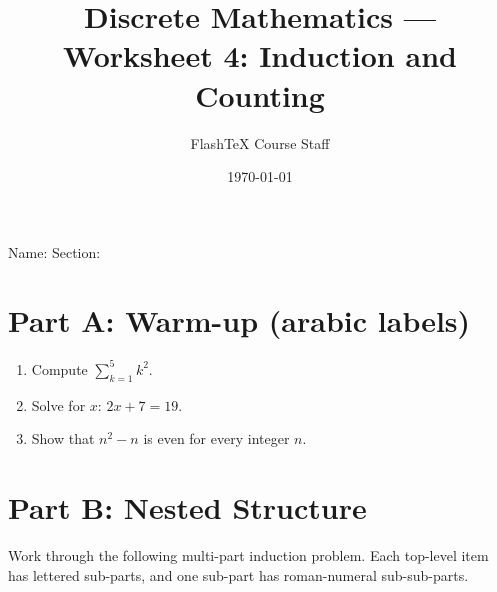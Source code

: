 \documentclass[12pt]{article}
\title{Discrete Mathematics --- Worksheet 4: Induction and Counting}
\author{FlashTeX Course Staff}
\date{\today}
\begin{document}
\maketitle

\noindent Name: \hrulefill \qquad Section: \hrulefill

\section*{Part A: Warm-up (arabic labels)}

\begin{enumerate}[label=\arabic*.]
  \item Compute $\sum_{k=1}^{5} k^2$.

  \vspace{1cm}
  \hrulefill

  \item Solve for $x$: $2x + 7 = 19$.

  \vspace{1cm}
  \hrulefill

  \item Show that $n^2 - n$ is even for every integer $n$.

  \vspace{1.5cm}
  \hrulefill
\end{enumerate}

\section*{Part B: Nested Structure}

Work through the following multi-part induction problem. Each top-level
item has lettered sub-parts, and one sub-part has roman-numeral sub-sub-parts.
\end{document}
